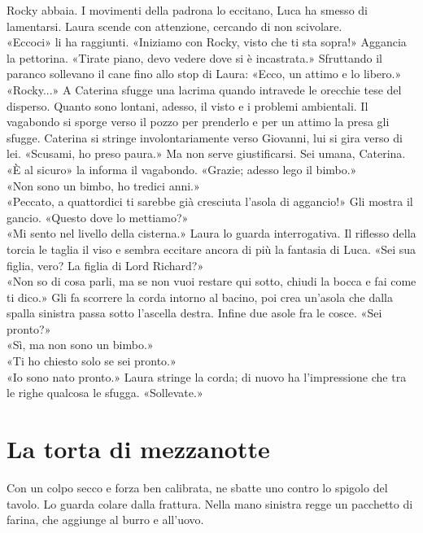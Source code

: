 \documentclass[10pt,oneside]{extbook}
\begin{document}
\par\medskip
Rocky abbaia. I movimenti della padrona lo eccitano, Luca ha smesso di lamentarsi. Laura scende con attenzione, cercando di non scivolare.\\
«Eccoci» li ha raggiunti. «Iniziamo con Rocky, visto che ti sta sopra!» Aggancia la pettorina. «Tirate piano, devo vedere dove si \`e incastrata.» Sfruttando il paranco sollevano il cane fino allo stop di Laura: «Ecco, un attimo e lo libero.»\\
«Rocky...» A Caterina sfugge una lacrima quando intravede le orecchie tese del disperso. Quanto sono lontani, adesso, il visto e i problemi ambientali.
Il vagabondo si sporge verso il pozzo per prenderlo e per un attimo la presa gli sfugge. Caterina si stringe involontariamente verso Giovanni, lui si gira verso di lei. «Scusami, ho preso paura.» Ma non serve giustificarsi. Sei umana, Caterina.\\
«\`E al sicuro» la informa il vagabondo. «Grazie; adesso lego il bimbo.»\\
«Non sono un bimbo, ho tredici anni.»\\
«Peccato, a quattordici ti sarebbe gi\`a cresciuta l’asola di aggancio!» Gli mostra il gancio. «Questo dove lo mettiamo?»\\
«Mi sento nel livello della cisterna.» Laura lo guarda interrogativa. Il riflesso della torcia le taglia il viso e sembra eccitare ancora di pi\`u la fantasia di Luca. «Sei sua figlia, vero? La figlia di Lord Richard?»\\
«Non so di cosa parli, ma se non vuoi restare qui sotto, chiudi la bocca e fai come ti dico.»
Gli fa scorrere la corda intorno al bacino, poi crea un’asola che dalla spalla sinistra passa sotto l’ascella destra.
Infine due asole fra le cosce.
«Sei pronto?»\\
«Sì, ma non sono un bimbo.»\\
«Ti ho chiesto solo se sei pronto.»\\
«Io sono nato pronto.» Laura stringe la corda; di nuovo ha l'impressione che tra le righe qualcosa le sfugga. «Sollevate.»

\clearpage{}
\clearpage{}\chapter{La torta di mezzanotte}

Con un colpo secco e forza ben calibrata, ne sbatte uno contro lo spigolo del tavolo.  
Lo guarda colare dalla frattura.  
Nella mano sinistra regge un pacchetto di farina, che aggiunge al burro e all’uovo.
\end{document}
